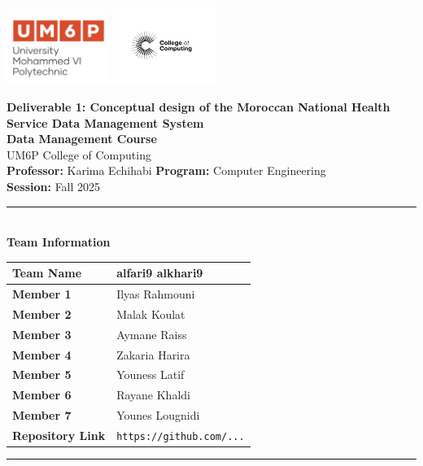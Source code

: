 \documentclass[a4paper,12pt]{article}
\begin{document}
\thispagestyle{empty}
\begin{center}
  \includegraphics[width=0.25\textwidth]{Figures/UM6Plogo.png}\hfill
  \includegraphics[width=0.25\textwidth]{Figures/CC.jpg}
  \vspace{1.2cm}

  {\LARGE \textbf{Deliverable 1: Conceptual design of the Moroccan National Health Service Data Management System}}\\[0.6cm]
  {\large \textbf{Data Management Course}}\\[0.2cm]
  {\large UM6P College of Computing}\\[0.8cm]

  {\normalsize \textbf{Professor:} Karima Echihabi \quad 
   \textbf{Program:} Computer Engineering}\\[0.1cm]
  {\normalsize \textbf{Session:} Fall 2025}\\[1cm]

  \rule{0.9\textwidth}{0.5pt}\\[0.5cm]
  {\large \textbf{Team Information}} \\[0.3cm]
  \begin{tabular}{|l|l|}
    \hline
    \textbf{Team Name} & alfari9 alkhari9 \\ \hline
    \textbf{Member 1}  & Ilyas Rahmouni \\ \hline
    \textbf{Member 2}  & Malak Koulat   \\ \hline
    \textbf{Member 3}  & Aymane Raiss   \\ \hline
    \textbf{Member 4}  & Zakaria Harira   \\ \hline
    \textbf{Member 5}  & Youness Latif   \\ \hline
    \textbf{Member 6}  & Rayane Khaldi   \\ \hline
    \textbf{Member 7}  & Younes Lougnidi   \\ \hline
    \textbf{Repository Link} & \texttt{https://github.com/...} \\ \hline
  \end{tabular}
  \rule{0.9\textwidth}{0.5pt}\\
\end{center}
\clearpage
\pagestyle{fancy}
\end{document}
